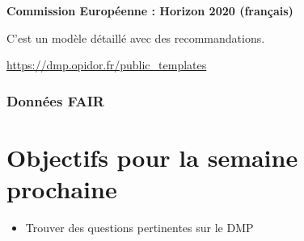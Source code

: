 \documentclass[14pt,oneside]{article}
\begin{document}
\begin{flushleft}
\textbf{Commission Européenne : Horizon 2020 (français)}
\end{flushleft}

\begin{flushleft}
C’est un modèle détaillé avec des recommandations.
\end{flushleft}

\begin{flushleft}
\url{https://dmp.opidor.fr/public_templates}
\end{flushleft}

\section*{Données FAIR}

\newpage
\part*{Objectifs pour la semaine prochaine}
\begin{itemize}
	\item Trouver des questions pertinentes sur le DMP
\end{itemize}
\end{document}
